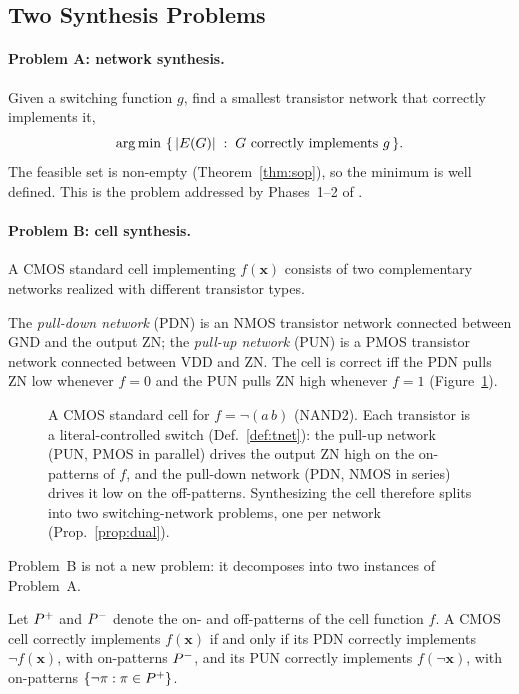 \subsection{Two Synthesis Problems}
\label{sec:pre_prob}

\paragraph{Problem A: network synthesis.}
Given a switching function $g$, find a smallest transistor network that
correctly implements it,
\[
  \operatorname*{arg\,min}\ \{\, |E(G)| \;:\; G \text{ correctly implements } g \,\}.
\]
The feasible set is non-empty (Theorem~\ref{thm:sop}), so the minimum is well
defined.  This is the problem addressed by Phases~1--2 of \method.

\paragraph{Problem B: cell synthesis.}
A CMOS standard cell implementing $f(\mathbf{x})$ consists of two
complementary networks realized with different transistor types.

\begin{definition}
\label{def:pdnpun}
The \emph{pull-down network} (PDN) is an NMOS transistor network connected
between $\mathrm{GND}$ and the output $\mathrm{ZN}$; the \emph{pull-up
network} (PUN) is a PMOS transistor network connected between $\mathrm{VDD}$
and $\mathrm{ZN}$.
The cell is correct iff the PDN pulls $\mathrm{ZN}$ low whenever $f = 0$ and
the PUN pulls $\mathrm{ZN}$ high whenever $f = 1$ (Figure~\ref{fig:cmos}).
\end{definition}

\begin{figure}[t]
\centering
\resizebox{\columnwidth}{!}{}
\caption{A CMOS standard cell for $f=\lnot(a\,b)$ (NAND2).  Each transistor is
a literal-controlled switch (Def.~\ref{def:tnet}): the pull-up network (PUN,
PMOS in parallel) drives the output $\mathrm{ZN}$ high on the on-patterns of
$f$, and the pull-down network (PDN, NMOS in series) drives it low on the
off-patterns.  Synthesizing the cell therefore splits into two switching-network
problems, one per network (Prop.~\ref{prop:dual}).}
\label{fig:cmos}
\end{figure}

Problem~B is not a new problem: it decomposes into two instances of
Problem~A.

\begin{proposition}
\label{prop:dual}
Let $P^{+}$ and $P^{-}$ denote the on- and off-patterns of the cell function
$f$.
A CMOS cell correctly implements $f(\mathbf{x})$ if and only if its PDN
correctly implements $\lnot f(\mathbf{x})$, with on-patterns $P^{-}$, and its
PUN correctly implements $f(\lnot\mathbf{x})$, with on-patterns
$\{\lnot\pi : \pi \in P^{+}\}$.
\end{proposition}

